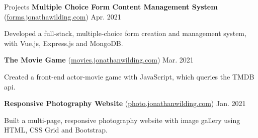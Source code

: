 \documentclass{resume} %
\begin{document}
\begin{rSection}{Projects}
    \textbf{Multiple Choice Form Content Management System}
    (\href{https://forms.jonathanwilding.com}{forms.jonathawilding.com}) \hfill{Apr. 2021}
    \begin{compactitem}
        \item Developed a full-stack, multiple-choice form creation and management system, with
            Vue.js, Express.js and MongoDB.
    \end{compactitem}
    \textbf{The Movie Game} (\href{https://movies.jonathanwilding.com}{movies.jonathanwilding.com}) \hfill{Mar. 2021}
    \begin{compactitem}
        \item Created a front-end actor-movie game with JavaScript, which queries the TMDB api.
    \end{compactitem}
    \textbf{Responsive Photography Website} (\href{https://photo.jonathanwilding.com}{photo.jonathanwilding.com}) \hfill{Jan. 2021}
    \begin{compactitem}
        \item Built a multi-page, responsive photography website with image gallery using HTML, CSS Grid and
            Bootstrap.
    \end{compactitem}
\end{rSection}
\end{document}
